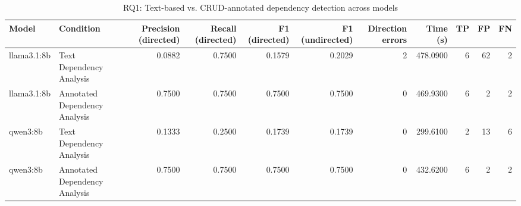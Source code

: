 \begin{table}
\caption{RQ1: Text-based vs. CRUD-annotated dependency detection across models}
\label{tab:rq1_summary}
\begin{tabular}{llrrrrrrrrr}
\toprule
Model & Condition & Precision (directed) & Recall (directed) & F1 (directed) & F1 (undirected) & Direction errors & Time (s) & TP & FP & FN \\
\midrule
llama3.1:8b & Text Dependency Analysis & 0.0882 & 0.7500 & 0.1579 & 0.2029 & 2 & 478.0900 & 6 & 62 & 2 \\
llama3.1:8b & Annotated Dependency Analysis & 0.7500 & 0.7500 & 0.7500 & 0.7500 & 0 & 469.9300 & 6 & 2 & 2 \\
qwen3:8b & Text Dependency Analysis & 0.1333 & 0.2500 & 0.1739 & 0.1739 & 0 & 299.6100 & 2 & 13 & 6 \\
qwen3:8b & Annotated Dependency Analysis & 0.7500 & 0.7500 & 0.7500 & 0.7500 & 0 & 432.6200 & 6 & 2 & 2 \\
\bottomrule
\end{tabular}
\end{table}
